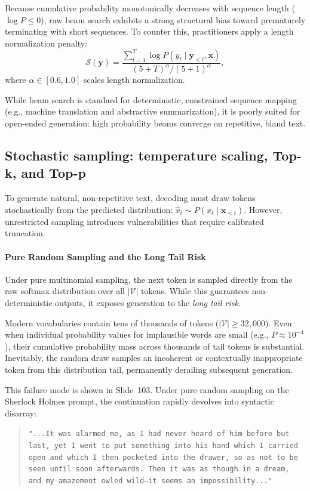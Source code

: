 \documentclass[../../../main.tex]{subfiles}
\begin{document}
Because cumulative probability monotonically decreases with sequence length ($\log P \le 0$), raw beam search exhibits a strong structural bias toward prematurely terminating with short sequences. To counter this, practitioners apply a length normalization penalty:
\begin{equation}
\mathcal{S}(\mathbf{y}) = \frac{\sum_{t=1}^T \log P(y_t \mid \mathbf{y}_{<t}, \mathbf{x})}{(5 + T)^\alpha / (5 + 1)^\alpha},
\label{eq:beam_length_penalty}
\end{equation}
where $\alpha \in [0.6, 1.0]$ scales length normalization.

While beam search is standard for deterministic, constrained sequence mapping (e.g., machine translation and abstractive summarization), it is poorly suited for open-ended generation: high probability beams converge on repetitive, bland text.


\subsection{Stochastic sampling: temperature scaling, Top-k, and Top-p}
\label{subsec:stochastic_sampling}

To generate natural, non-repetitive text, decoding must draw tokens stochastically from the predicted distribution: $\hat{x}_t \sim P(x_t \mid \mathbf{x}_{<t})$. However, unrestricted sampling introduces vulnerabilities that require calibrated truncation.

\paragraph{Pure Random Sampling and the Long Tail Risk}
Under pure multinomial sampling, the next token is sampled directly from the raw softmax distribution over all $|\mathcal{V}|$ tokens. While this guarantees non-deterministic outputs, it exposes generation to the \emph{long tail risk}.

Modern vocabularies contain tens of thousands of tokens ($|\mathcal{V}| \ge 32,000$). Even when individual probability values for implausible words are small (e.g., $P \approx 10^{-4}$), their cumulative probability mass across thousands of tail tokens is substantial. Inevitably, the random draw samples an incoherent or contextually inappropriate token from this distribution tail, permanently derailing subsequent generation.

This failure mode is shown in Slide~103. Under pure random sampling on the Sherlock Holmes prompt, the continuation rapidly devolves into syntactic disarray:
\begin{quote}
\texttt{"...It was alarmed me, as I had never heard of him before but last, yet I went to put something into his hand which I carried open and which I then pocketed into the drawer, so as not to be seen until soon afterwards. Then it was as though in a dream, and my amazement owled wild--it seems an impossibility..."}
\end{quote}
\end{document}
